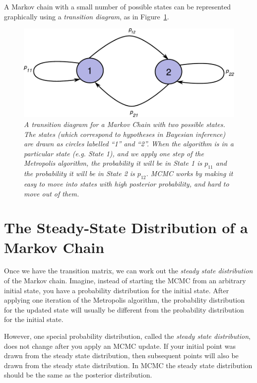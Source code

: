 A Markov chain with a small number of possible states can be represented
graphically using a {\it transition diagram}, as in
Figure~\ref{fig:transitions}.

\begin{figure}[ht!]
\begin{center}
\includegraphics[scale=0.65]{Figures/transitions.pdf}
\caption{\it A transition diagram for a Markov Chain with two possible states.
The states (which correspond to hypotheses in Bayesian inference) are drawn
as circles labelled ``1'' and ``2''. When the algorithm is in a particular state
(e.g. State 1), and we apply one step of the Metropolis algorithm,
the probability it will be in State 1 is $p_{11}$ and the probability it
will be in State 2 is $p_{12}$.
MCMC works by making it easy to move into states with high
posterior probability, and hard to move out of them.
\label{fig:transitions}}
\end{center}
\end{figure}

\section{The Steady-State Distribution of a Markov Chain}
Once we have the transition matrix, we can work out the {\it steady state
distribution} of the Markov chain. Imagine, instead of starting the MCMC
from an arbitrary initial state, you have a probability distribution for the
initial state. After applying one iteration of the Metropolis algorithm, the
probability distribution for the updated state will usually be different from
the probability distribution for the initial state.

However, one special probability distribution, called the {\it steady state
distribution}, does not change after you apply an MCMC update. If your initial
point was drawn from the steady state distribution, then subsequent points will
also be drawn from the steady state distribution. In MCMC the steady state
distribution should be the same as the posterior distribution.

